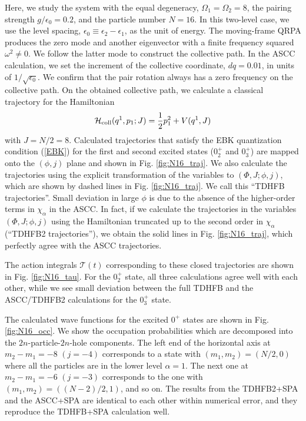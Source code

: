 \documentclass[%
superscriptaddress,
showpacs,
nofootinbib,
amsmath,amssymb,
aps,
prc,
twocolumn,
floatfix ]%
{revtex4-1}
\begin{document}
Here, we study the system with the equal degeneracy,
$\Omega_1=\Omega_2=8$, 
the pairing strength $g/\epsilon_0=0.2$,
and the particle number $N=16$. 
In this two-level case, we use the level spacing,
$\epsilon_0\equiv \epsilon_2-\epsilon_1$,
as the unit of energy.
The moving-frame QRPA produces the zero mode and another eigenvector
with a finite frequency squared $\omega^2\neq 0$.
We follow the latter mode to construct the collective path.
In the ASCC calculation, we set the increment of the
collective coordinate, $dq=0.01$,
in units of $1/\sqrt{\epsilon_0}$.
We confirm that the pair rotation always has a zero frequency
on the collective path.
On the obtained collective path, we calculate a classical trajectory
for the Hamiltonian
\begin{equation}
\mathcal{H}_{\rm coll}(q^1,p_1;J)=\frac{1}{2} p_1^2 + V(q^1,J)
\end{equation}
with $J=N/2=8$.
Calculated trajectories that satisfy the EBK quantization condition
(\ref{EBK}) for the first and second excited states ($0_2^+$ and $0_3^+$)
are mapped onto the $(\phi,j)$ plane and
shown in Fig. \ref{fig:N16_traj}.
We also calculate the trajectories using the explicit transformation
of the variables to $(\Phi,J;\phi,j)$, which
are shown by dashed lines in Fig. \ref{fig:N16_traj}.
We call this ``TDHFB trajectories''.
Small deviation in large $\phi$ is due to the absence of the higher-order
terms in $\chi_\alpha$ in the ASCC.
In fact, if we calculate the trajectories in the variables
$(\Phi,J;\phi,j)$ using the Hamiltonian truncated up to the
second order in $\chi_\alpha$ (``TDHFB2 trajectories''),
we obtain the solid lines in Fig. \ref{fig:N16_traj},
which perfectly agree with the ASCC trajectories.

The action integrals $\mathcal{T}(t)$ corresponding to
these closed trajectories are shown in Fig. \ref{fig:N16_tau}.
For the $0_2^+$ state,
all three calculations agree well
with each other, while we see small deviation between the full TDHFB
and the ASCC/TDHFB2 calculations for the $0_3^+$ state.

The calculated wave functions for the excited $0^+$ states 
are shown in Fig. \ref{fig:N16_occ}. 
We show the occupation probabilities which are decomposed 
into the $2n$-particle-$2n$-hole components. 
The left end of the horizontal axis at $m_2-m_1=-8$ $(j=-4)$
corresponds to a state with $(m_1,m_2)=(N/2,0)$ where all the particles
are in the lower level $\alpha=1$.
The next one at $m_2-m_1=-6$ $(j=-3)$ corresponds to the one with
$(m_1,m_2)=((N-2)/2,1)$, and so on.
The results from the TDHFB2+SPA and the ASCC+SPA are identical to each other
within numerical error, and they reproduce
the TDHFB+SPA calculation well.
\end{document}
